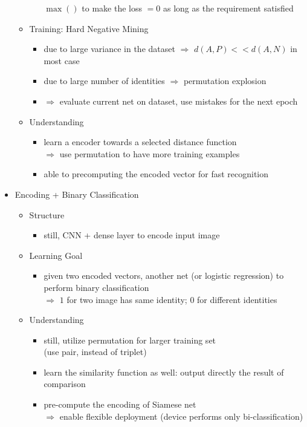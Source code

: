 \begin{itemize}
\begin{itemize}
\begin{itemize}
		$\max()$ to make the loss $=0$ as long as the requirement satisfied
		\end{itemize}
	\item Training: Hard Negative Mining
		\begin{itemize}
		\item due to large variance in the dataset $\Rightarrow$ $d(A,P) << d(A,N)$ in most case
		\item due to large number of identities $\Rightarrow$ permutation explosion
		\item $\Rightarrow$ evaluate current net on dataset, use mistakes for the next epoch
		\end{itemize}
	\item Understanding
		\begin{itemize}
		\item learn a encoder towards a selected distance function \\
		$\Rightarrow$ use permutation to have more training examples
		\item able to precomputing the encoded vector for fast recognition
		\end{itemize}
	\end{itemize}

\item Encoding + Binary Classification
	\begin{itemize}
	\item Structure
		\begin{itemize}
		\item still, CNN + dense layer to encode input image
		\end{itemize}
	\item Learning Goal
		\begin{itemize}
		\item given two encoded vectors, another net (or logistic regression) to perform binary classification \\
		$\Rightarrow$ $1$ for two image has same identity; $0$ for different identities
		\end{itemize}
	\item Understanding
		\begin{itemize}
		\item still, utilize permutation for larger training set \\ 
		(use pair, instead of triplet)
		\item learn the similarity function as well: output directly the result of comparison
		\item pre-compute the encoding of Siamese net \\
		$\Rightarrow$ enable flexible deployment (device performs only bi-classification)
		\end{itemize}
	\end{itemize}
\end{itemize}

